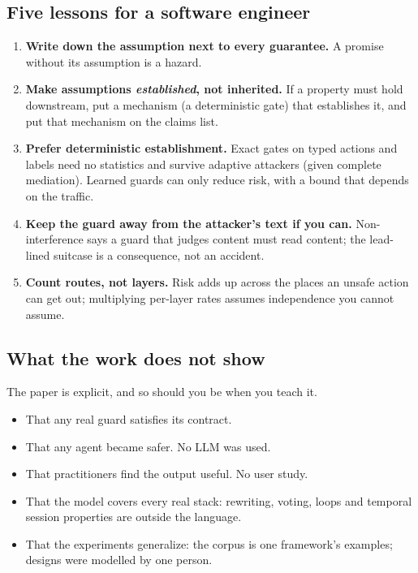 \subsection{Five lessons for a software engineer}

\begin{enumerate}
\item \textbf{Write down the assumption next to every guarantee.} A promise without its assumption is a hazard.
\item \textbf{Make assumptions \emph{established}, not inherited.} If a property must hold downstream, put a mechanism (a deterministic gate) that establishes it, and put that mechanism on the claims list.
\item \textbf{Prefer deterministic establishment.} Exact gates on typed actions and labels need no statistics and survive adaptive attackers (given complete mediation). Learned guards can only reduce risk, with a bound that depends on the traffic.
\item \textbf{Keep the guard away from the attacker's text if you can.} Non-interference says a guard that judges content must read content; the lead-lined suitcase is a consequence, not an accident.
\item \textbf{Count routes, not layers.} Risk adds up across the places an unsafe action can get out; multiplying per-layer rates assumes independence you cannot assume.
\end{enumerate}

\subsection{What the work does not show}

The paper is explicit, and so should you be when you teach it.

\begin{itemize}
\item That any real guard satisfies its contract.
\item That any agent became safer. No LLM was used.
\item That practitioners find the output useful. No user study.
\item That the model covers every real stack: rewriting, voting, loops and temporal session properties are outside the language.
\item That the experiments generalize: the corpus is one framework's examples; designs were modelled by one person.
\end{itemize}

